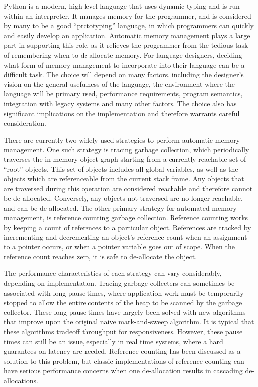 \documentclass{sigplanconf}
\begin{document}
Python is a modern, high level language that uses dynamic typing and is run within an interpreter.  It manages memory for the programmer, and is considered by many to be a good ``prototyping'' language, in which programmers can quickly and easily develop an application.   Automatic memory management plays a large part in supporting this role, as it relieves the programmer from the tedious task of remembering when to de-allocate memory.  For language designers, deciding what form of memory management to incorporate into their language can be a difficult task.  The choice will depend on many factors, including the designer's vision on the general usefulness of the language, the environment where the language will be primary used, performance requirements, program semantics, integration with legacy systems and many other factors.  The choice also has significant implications on the implementation and therefore warrants careful consideration.  

There are currently two widely used strategies to perform automatic memory management.  One such strategy is tracing garbage collection, which periodically traverses the in-memory object graph starting from a currently reachable set of ``root'' objects.  This set of objects includes all global variables, as well as the objects which are referenceable from the current stack frame.  Any objects that are traversed during this operation are considered reachable and therefore cannot be de-allocated.  Conversely, any objects not traversed are no longer reachable, and can be de-allocated.  The other primary strategy for automated memory management, is reference counting garbage collection. Reference counting works by keeping a count of references to a particular object.  References are tracked by incrementing and decrementing an object's reference count when an assignment to a pointer occurs, or when a pointer variable goes out of scope.  When the reference count reaches zero, it is safe to de-allocate the object.

The performance characteristics of each strategy can vary considerably, depending on implementation.   Tracing garbage collectors can sometimes be associated with long pause times, where application work must be temporarily stopped to allow the entire contents of the heap to be scanned by the garbage collector.  These long pause times have largely been solved with new algorithms that improve upon the original naive mark-and-sweep algorithm.  It is typical that these algorithms tradeoff throughput for responsiveness.  However, these pause times can still be an issue, especially in real time systems, where a hard guarantees on latency are needed.  Reference counting has been discussed as a solution to this problem, but classic implementations of reference counting can have serious performance concerns when one de-allocation results in cascading de-allocations\cite{boehm}.  
\end{document}
